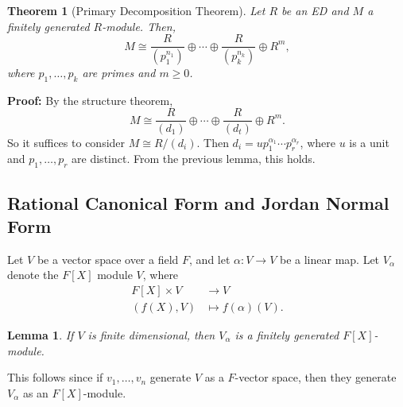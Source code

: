 \documentclass[12pt]{article}
\newtheorem{theorem}{Theorem}[section]
\newtheorem{lemma}{Lemma}[section]
\theoremstyle{definition}
\theoremstyle{remark}
\begin{document}
\begin{theorem}[Primary Decomposition Theorem]
	Let $R$ be an ED and $M$ a finitely generated $R$-module. Then,
	\[
		M \cong \frac{R}{(p_1^{n_1})} \oplus \cdots \oplus \frac{R}{(p_k^{n_k})} \oplus R^{m}
	,\]
	where $p_1, \ldots, p_k$ are primes and $m \geq 0$.
\end{theorem}

\begin{adjustbox}{minipage = \columnwidth - 25.5pt, margin=1em, frame=1pt, margin=0em}
\textbf{Proof:} By the structure theorem,
\[
	M \cong \frac{R}{(d_1)} \oplus \cdots \oplus \frac{R}{(d_t)} \oplus R^{m}
.\]
So it suffices to consider $M \cong R/(d_i)$. Then $d_i = u p_1^{\alpha_1} \cdots p_r^{\alpha_r}$, where $u$ is a unit and $p_1, \ldots, p_r$ are distinct. From the previous lemma, this holds.
\end{adjustbox}

\subsection{Rational Canonical Form and Jordan Normal Form}%
\label{sub:rational_canonical_form_and_jordan_normal_form}

Let $V$ be a vector space over a field $F$, and let $\alpha : V \to V$ be a linear map. Let $V_\alpha$ denote the $F[X]$ module $V$, where
\begin{align*}
	F[X] \times V &\to V \\
	(f(X), V) &\mapsto f(\alpha)(V).
\end{align*}

\begin{lemma}
	If $V$ is finite dimensional, then $V_{\alpha}$ is a finitely generated $F[X]$-module.
\end{lemma}

This follows since if $v_1, \ldots, v_n$ generate $V$ as a $F$-vector space, then they generate $V_{\alpha}$ as an $F[X]$-module.
\end{document}
